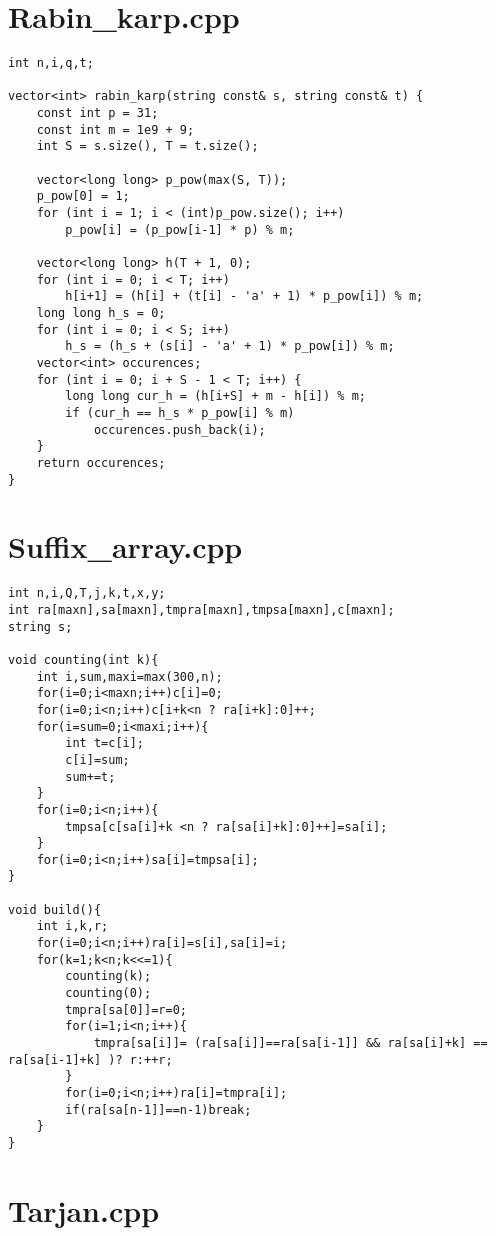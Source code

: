 \documentclass[a4paper,landscape,8pt]{extarticle}
\begin{document}
\begin{multicols}{3}
\section*{Rabin\_karp.cpp}

\begin{lstlisting}
int n,i,q,t;

vector<int> rabin_karp(string const& s, string const& t) {
    const int p = 31; 
    const int m = 1e9 + 9;
    int S = s.size(), T = t.size();

    vector<long long> p_pow(max(S, T)); 
    p_pow[0] = 1; 
    for (int i = 1; i < (int)p_pow.size(); i++) 
        p_pow[i] = (p_pow[i-1] * p) % m;

    vector<long long> h(T + 1, 0); 
    for (int i = 0; i < T; i++)
        h[i+1] = (h[i] + (t[i] - 'a' + 1) * p_pow[i]) % m; 
    long long h_s = 0; 
    for (int i = 0; i < S; i++) 
        h_s = (h_s + (s[i] - 'a' + 1) * p_pow[i]) % m; 
    vector<int> occurences;
    for (int i = 0; i + S - 1 < T; i++) { 
        long long cur_h = (h[i+S] + m - h[i]) % m; 
        if (cur_h == h_s * p_pow[i] % m)
            occurences.push_back(i);
    }
    return occurences;
}
\end{lstlisting}

\section*{Suffix\_array.cpp}

\begin{lstlisting}
int n,i,Q,T,j,k,t,x,y;
int ra[maxn],sa[maxn],tmpra[maxn],tmpsa[maxn],c[maxn];
string s;

void counting(int k){
    int i,sum,maxi=max(300,n);
    for(i=0;i<maxn;i++)c[i]=0;
    for(i=0;i<n;i++)c[i+k<n ? ra[i+k]:0]++;
    for(i=sum=0;i<maxi;i++){
        int t=c[i];
        c[i]=sum;
        sum+=t;
    }
    for(i=0;i<n;i++){
        tmpsa[c[sa[i]+k <n ? ra[sa[i]+k]:0]++]=sa[i];
    }
    for(i=0;i<n;i++)sa[i]=tmpsa[i];
}

void build(){
    int i,k,r;
    for(i=0;i<n;i++)ra[i]=s[i],sa[i]=i;
    for(k=1;k<n;k<<=1){
        counting(k);
        counting(0);
        tmpra[sa[0]]=r=0;
        for(i=1;i<n;i++){
            tmpra[sa[i]]= (ra[sa[i]]==ra[sa[i-1]] && ra[sa[i]+k] == ra[sa[i-1]+k] )? r:++r;
        }
        for(i=0;i<n;i++)ra[i]=tmpra[i];
        if(ra[sa[n-1]]==n-1)break;
    }
}
\end{lstlisting}

\section*{Tarjan.cpp}


\end{multicols}
\end{document}
